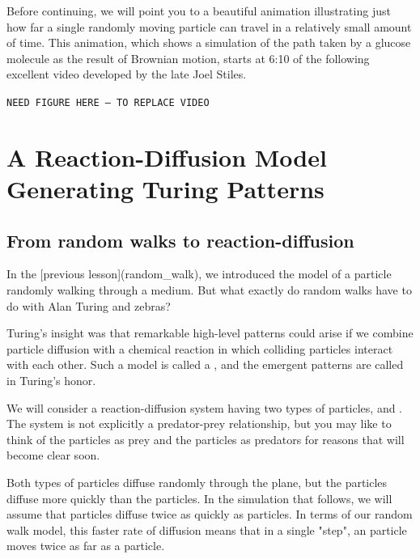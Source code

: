 Before continuing, we will point you to a beautiful animation illustrating just how far a single randomly moving particle can travel in a relatively small amount of time. This animation, which shows a simulation of the path taken by a glucose molecule as the result of Brownian motion, starts at 6:10 of the following excellent video developed by the late Joel Stiles.

\texttt{NEED FIGURE HERE -- TO REPLACE VIDEO}\\

















\FloatBarrier
{}

\section{A Reaction-Diffusion Model Generating Turing Patterns}
\label{sec:a_reaction-diffusion_model_generating_turing_patterns}

\subsection{From random walks to reaction-diffusion}

In the [previous lesson](random_walk), we introduced the model of a particle randomly walking through a medium. But what exactly do random walks have to do with Alan Turing and zebras?

Turing's insight was that remarkable high-level patterns could arise if we combine particle diffusion with a chemical reaction in which colliding particles interact with each other. Such a model is called a , and the emergent patterns are called  in Turing's honor.

We will consider a reaction-diffusion system having two types of particles,  and . The system is not explicitly a predator-prey relationship, but you may like to think of the  particles as prey and the  particles as predators for reasons that will become clear soon.

Both types of particles diffuse randomly through the plane, but the  particles diffuse more quickly than the  particles.  In the simulation that follows, we will assume that  particles diffuse twice as quickly as  particles. In terms of our random walk model, this faster rate of diffusion means that in a single "step", an  particle moves twice as far as a  particle.

